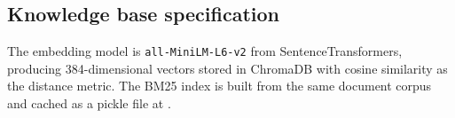 \subsection{Knowledge base specification}

\begin{table}[htbp]
\centering
\caption{Knowledge base v2 composition}
\renewcommand{\arraystretch}{1.3}
\end{table}

The embedding model is \texttt{all-MiniLM-L6-v2} from SentenceTransformers, producing 384-dimensional vectors stored in ChromaDB with cosine similarity as the distance metric. The BM25 index is built from the same document corpus and cached as a pickle file at .
